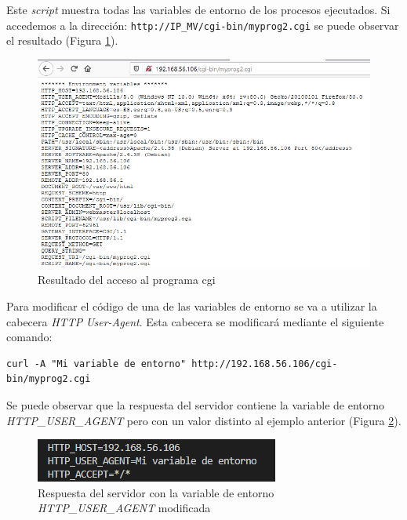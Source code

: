 \documentclass[10pt,a4paper]{article}
\begin{document}


Este \emph{script} muestra todas las variables de entorno de los procesos ejecutados. Si accedemos a la dirección: \texttt{http://IP\_{}MV/cgi-bin/myprog2.cgi} se puede observar el resultado (Figura \ref{fig:tarea3_normal}).

\begin{figure}[h!]
\centering
\includegraphics[scale=0.6]{images/Tarea_3.png}
\caption{Resultado del acceso al programa cgi}
\label{fig:tarea3_normal} 
\end{figure}

Para modificar el código de una de las variables de entorno se va a utilizar la cabecera \emph{HTTP} \emph{User-Agent}. Esta cabecera se modificará mediante el siguiente comando:

\begin{lstlisting}
curl -A "Mi variable de entorno" http://192.168.56.106/cgi-bin/myprog2.cgi
\end{lstlisting}

Se puede observar que la respuesta del servidor contiene la variable de entorno \emph{HTTP\_{}USER\_{}AGENT} pero con un valor distinto al ejemplo anterior (Figura \ref{fig:tarea3_modificado}).

\begin{figure}[h!]
\centering
\includegraphics[scale=0.9]{images/Tarea_3_modificada.png}
\caption{Respuesta del servidor con la variable de entorno \emph{HTTP\_{}USER\_{}AGENT} modificada}
\label{fig:tarea3_modificado} 
\end{figure}
\end{document}
